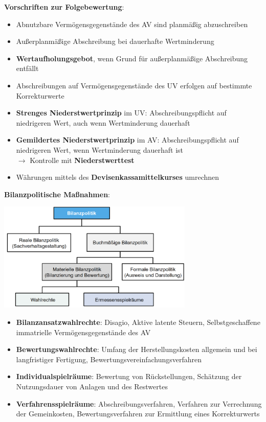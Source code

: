 \textbf{Vorschriften zur Folgebewertung}:
\begin{itemize}
	\item Abnutzbare Vermögensgegenstände des AV sind planmäßig abzuschreiben
	\item Außerplanmäßige Abschreibung bei dauerhafte Wertminderung
	\item \textbf{Wertaufholungsgebot}, wenn Grund für außerplanmäßige Abschreibung entfällt
	\item Abschreibungen auf Vermögensgegenstände des UV erfolgen auf bestimmte Korrekturwerte 
	\item \textbf{Strenges Niederstwertprinzip} im UV: Abschreibungspflicht auf niedrigeren Wert, auch wenn Wertminderung dauerhaft
	\item \textbf{Gemildertes Niederstwertprinzip} im AV: Abschreibungspflicht auf niedrigeren Wert, wenn Wertminderung dauerhaft ist\\
	$\rightarrow$ Kontrolle mit \textbf{Niederstwerttest}
	\item Währungen mittels des \textbf{Devisenkassamittelkurses} umrechnen
\end{itemize}
\bigskip
\textbf{Bilanzpolitische Maßnahmen}:
\begin{center}
	\includegraphics[width=0.7\textwidth]{images/bp.png}
\end{center}
\begin{itemize}
	\item \textbf{Bilanzansatzwahlrechte}: Disagio, Aktive latente Steuern, Selbstgeschaffene immatrielle Vermögensgegenstände des AV
	\item \textbf{Bewertungswahlrechte}: Umfang der Herstellungskosten allgemein und bei langfristiger Fertigung, Bewertungsvereinfachungsverfahren
	\item \textbf{Individualspielräume}: Bewertung von Rückstellungen, Schätzung der Nutzungsdauer von Anlagen und des Restwertes
	\item \textbf{Verfahrensspielräume}: Abschreibungsverfahren, Verfahren zur Verrechnung der Gemeinkosten, Bewertungsverfahren zur Ermittlung eines Korrekturwerts
\end{itemize}